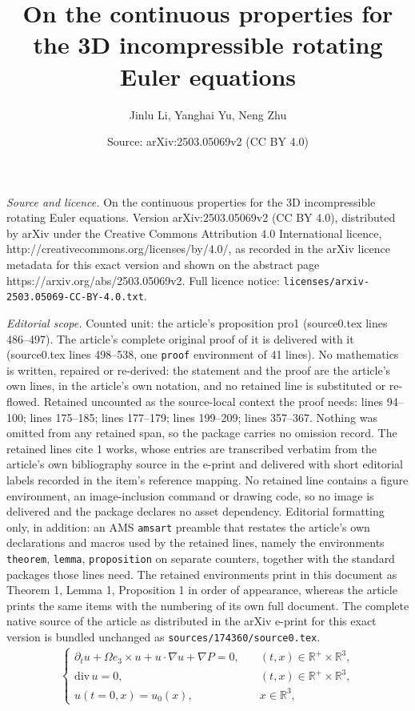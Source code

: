 \documentclass[10pt,a4paper]{amsart}
\title{On the continuous properties for the 3D incompressible rotating Euler equations}
\author{Jinlu Li, Yanghai Yu, Neng Zhu}
\date{Source: arXiv:2503.05069v2 (CC BY 4.0)}
\newcommand{\R}{\mathbb{R}}
\newcommand{\pa}{\partial}
\begin{document}
\maketitle

\noindent\emph{Source and licence.} On the continuous properties for the 3D incompressible rotating Euler equations. Version arXiv:2503.05069v2 (CC BY 4.0), distributed by arXiv under the Creative Commons Attribution 4.0 International licence, http://creativecommons.org/licenses/by/4.0/, as recorded in the arXiv licence metadata for this exact version and shown on the abstract page https://arxiv.org/abs/2503.05069v2. Full licence notice: \texttt{licenses/arxiv-2503.05069-CC-BY-4.0.txt}.\par\smallskip

\noindent\textit{Editorial scope.} Counted unit: the article's proposition pro1 (source0.tex lines 486--497). The article's complete original proof of it is delivered with it (source0.tex lines 498--538, one \texttt{proof} environment of 41 lines). No mathematics is written, repaired or re-derived: the statement and the proof are the article's own lines, in the article's own notation, and no retained line is substituted or re-flowed.  Retained uncounted as the source-local context the proof needs: lines 94--100; lines 175--185; lines 177--179; lines 199--209; lines 357--367.  Nothing was omitted from any retained span, so the package carries no omission record.  The retained lines cite 1 works, whose entries are transcribed verbatim from the article's own bibliography source in the e-print and delivered with short editorial labels recorded in the item's reference mapping.  No retained line contains a figure environment, an image-inclusion command or drawing code, so no image is delivered and the package declares no asset dependency.  Editorial formatting only, in addition: an AMS \texttt{amsart} preamble that restates the article's own declarations and macros used by the retained lines, namely the environments \texttt{theorem}, \texttt{lemma}, \texttt{proposition} on separate counters, together with the standard packages those lines need.  The retained environments print in this document as Theorem 1, Lemma 1, Proposition 1 in order of appearance, whereas the article prints the same items with the numbering of its own full document.  The complete native source of the article as distributed in the arXiv e-print for this exact version is bundled unchanged as \texttt{sources/174360/source0.tex}.
\begin{align}\label{CE}
\begin{cases}
\pa_t u+\Omega e_3\times u+u\cdot \nabla u+\nabla P=0, &\quad (t,x)\in \R^+\times\R^3,\\
\mathrm{div\,} u=0,&\quad (t,x)\in \R^+\times\R^3,\\
u(t=0,x)=u_0(x), &\quad x\in \R^3,
\end{cases}
\end{align}
\end{document}

